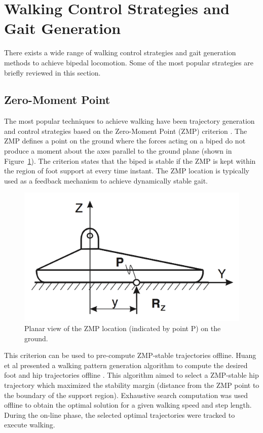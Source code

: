 \section{Walking Control Strategies and Gait Generation} %
\label{sec:related_control_strategies}
There exists a wide range of walking control strategies and gait generation methods to achieve bipedal locomotion. Some of the most popular strategies are briefly reviewed in this section.


\subsection{Zero-Moment Point} %
\label{sub:related_zero_moment_point}
The most popular techniques to achieve walking have been trajectory generation and control strategies based on the Zero-Moment Point (ZMP) criterion \cite{Vukobratovic:2004wy}. The ZMP defines a point on the ground where the forces acting on a biped do not produce a moment about the axes parallel to the ground plane (shown in Figure~\ref{fig:zmp}). The criterion states that the biped is stable if the ZMP is kept within the region of foot support at every time instant. The ZMP location is typically used as a feedback mechanism to achieve dynamically stable gait.  

\begin{figure}[!h]
	\begin{center}
    \includegraphics[scale=0.3]{fig/background/zmp.png}
	\end{center}
  \caption{Planar view of the ZMP location (indicated by point P) on the ground.}
  \label{fig:zmp}
\end{figure}

This criterion can be used to pre-compute ZMP-stable trajectories offline. Huang et al presented a walking pattern generation algorithm to compute the desired foot and hip trajectories offline \cite{HuangEtAlTRA2001}. This algorithm aimed to select a ZMP-stable hip trajectory which maximized the stability margin (distance from the ZMP point to the boundary of the support region). Exhaustive search computation was used offline to obtain the optimal solution for a given walking speed and step length. During the on-line phase, the selected optimal trajectories were tracked to execute walking.

